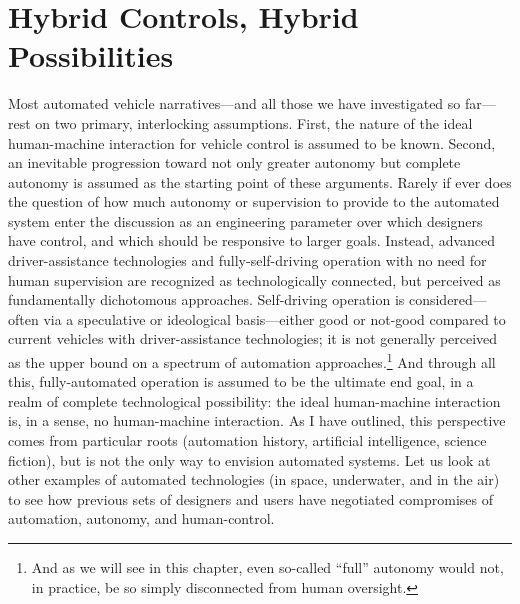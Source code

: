 \chapter{Hybrid Controls, Hybrid Possibilities}
\label{chap:3}






Most automated vehicle narratives---and all those we have investigated
so far---rest on two primary, interlocking assumptions. First, the nature of the
ideal human-machine interaction for vehicle control is assumed to be
known. Second, an inevitable progression toward not only greater
autonomy but complete autonomy is assumed as the
starting point of these arguments. Rarely if ever does the question of
how much autonomy or supervision to provide to the automated system
enter the discussion as an engineering parameter over which designers
have control, and which should be responsive to larger goals. Instead,
advanced driver-assistance technologies and fully-self-driving
operation with no need for human supervision are recognized as
technologically connected, but perceived as fundamentally dichotomous
approaches. Self-driving operation is considered---often via a
speculative or ideological basis---either good or not-good compared to
current vehicles with driver-assistance technologies; it is not generally
perceived as the upper bound on a spectrum of automation
approaches.\footnote{And as we will see in this chapter, even
  so-called ``full'' autonomy would not, in practice, be so simply
  disconnected from human oversight.} And through all this,
fully-automated operation is assumed to be the ultimate end goal, in a
realm of complete technological possibility: the ideal human-machine
interaction is, in a sense, no human-machine interaction. As I have
outlined, this perspective comes from particular roots (automation
history, artificial intelligence, science fiction), but is not the
only way to envision automated systems. Let us look at
other examples of automated technologies (in space, underwater, and in
the air) to see how previous sets of designers and users have
negotiated compromises of automation, autonomy, and human-control.

